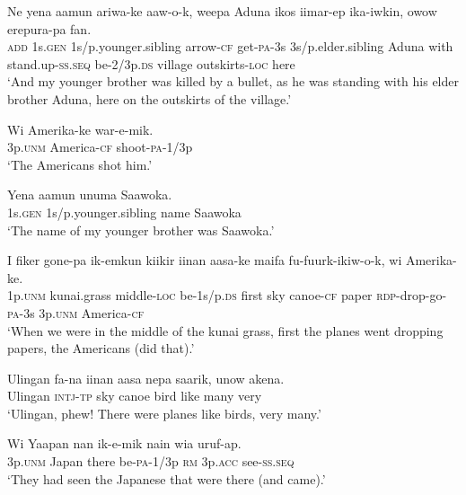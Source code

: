 {\ea\label{ex:a:x71}
\gll  Ne  yena  aamun  ariwa-ke  aaw-o-k, weepa  Aduna  ikos  iimar-ep  ika-iwkin,  owow  erepura-pa  fan. \\
\textsc{add}  1s.\textsc{gen}  1s/p.younger.sibling  arrow-\textsc{cf}  get-\textsc{pa}-3s 3s/p.elder.sibling  Aduna  with  stand.up-\textsc{ss.seq}  be-2/3p.\textsc{ds} village  outskirts-\textsc{loc}  here \\
\glt ‘And my younger brother was killed by a bullet, as he was standing with his elder brother Aduna, here on the outskirts of the village.’ \\
\z


\ea\label{ex:a:x72}
\gll  Wi  Amerika-ke  war-e-mik. \\
3p.\textsc{unm}  America-\textsc{cf}  shoot-\textsc{pa}-1/3p \\
\glt ‘The Americans shot him.’ \\
\z


\ea\label{ex:a:x73}
\gll  Yena  aamun  unuma  Saawoka. \\
1s.\textsc{gen}  1s/p.younger.sibling  name  Saawoka \\
\glt ‘The name of my younger brother was Saawoka.’ \\
\z


\ea\label{ex:a:x74}
\gll  I  fiker  gone-pa  ik-emkun  kiikir  iinan  aasa-ke maifa  fu-fuurk-ikiw-o-k,  wi  Amerika-ke. \\
1p.\textsc{unm}  kunai.grass  middle-\textsc{loc}  be-1s/p.\textsc{ds}  first  sky  canoe-\textsc{cf} paper  \textsc{rdp}-drop-go-\textsc{pa}-3s  3p.\textsc{unm}  America-\textsc{cf} \\
\glt ‘When we were in the middle of the kunai grass, first the planes went dropping papers, the Americans (did that).’ \\
\z


\ea\label{ex:a:x75}
\gll  Ulingan  fa-na  iinan  aasa  nepa  saarik,  unow  akena. \\
Ulingan  \textsc{intj}-\textsc{tp}  sky  canoe  bird  like  many  very \\
\glt ‘Ulingan, phew! There were planes like birds, very many.’ \\
\z


\ea\label{ex:a:x76}
\gll  Wi  Yaapan  nan  ik-e-mik  nain  wia  uruf-ap. \\
3p.\textsc{unm}  Japan  there  be-\textsc{pa}-1/3p  \textsc{rm}  3p.\textsc{acc}  see-\textsc{ss.seq} \\
\glt ‘They had seen the Japanese that were there (and came).’ \\
\z


}
